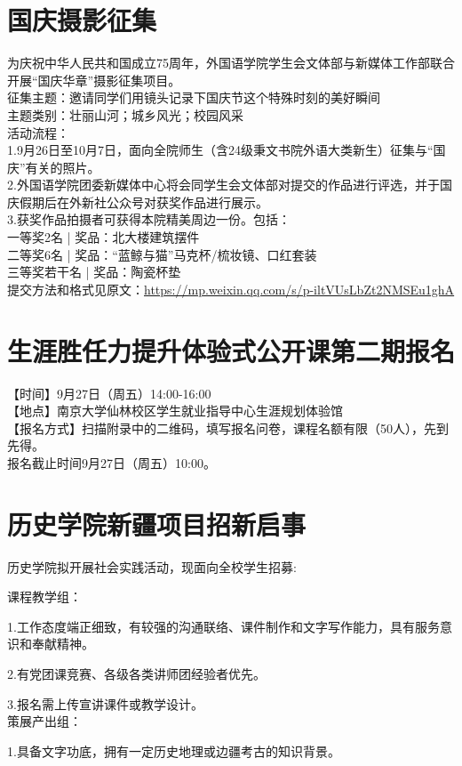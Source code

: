 \documentclass[letterpaper, 12pt]{article}
\begin{document}
\begin{multicols}{2}
\section{国庆摄影征集}
为庆祝中华人民共和国成立75周年，外国语学院学生会文体部与新媒体工作部联合开展“国庆华章”摄影征集项目。\\
征集主题：邀请同学们用镜头记录下国庆节这个特殊时刻的美好瞬间\\
主题类别：壮丽山河；城乡风光；校园风采\\
活动流程：\\
1.9月26日至10月7日，面向全院师生（含24级秉文书院外语大类新生）征集与“国庆”有关的照片。\\
2.外国语学院团委新媒体中心将会同学生会文体部对提交的作品进行评选，并于国庆假期后在外新社公众号对获奖作品进行展示。\\
3.获奖作品拍摄者可获得本院精美周边一份。包括：\\
一等奖2名 | 奖品：北大楼建筑摆件\\
二等奖6名 | 奖品：“蓝鲸与猫”马克杯/梳妆镜、口红套装\\
三等奖若干名 | 奖品：陶瓷杯垫\\
提交方法和格式见原文：\url{https://mp.weixin.qq.com/s/p-iltVUsLbZt2NMSEu1ghA}

\section{生涯胜任力提升体验式公开课第二期报名}
【时间】9月27日（周五）14:00-16:00\\
【地点】南京大学仙林校区学生就业指导中心生涯规划体验馆\\
【报名方式】扫描附录中的二维码，填写报名问卷，课程名额有限（50人），先到先得。\\
报名截止时间9月27日（周五）10:00。\\
\section{历史学院新疆项目招新启事}
历史学院拟开展社会实践活动，现面向全校学生招募:

课程教学组：

1.工作态度端正细致，有较强的沟通联络、课件制作和文字写作能力，具有服务意识和奉献精神。

2.有党团课竞赛、各级各类讲师团经验者优先。

3.报名需上传宣讲课件或教学设计。\\
策展产出组：

1.具备文字功底，拥有一定历史地理或边疆考古的知识背景。


\end{multicols}
\end{document}
